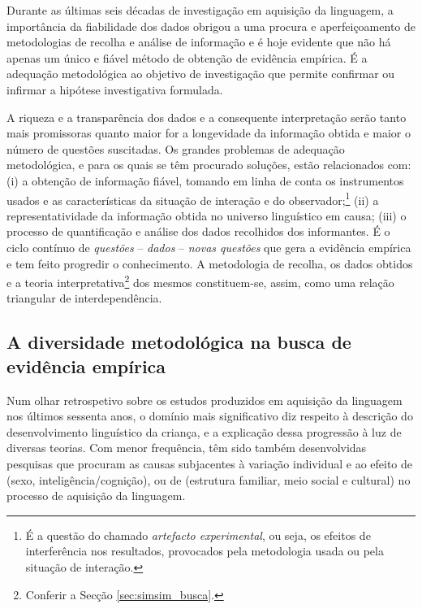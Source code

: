 \documentclass[output=paper]{LSP/langsci}
\begin{document}
Durante as últimas seis décadas de investigação em aquisição da linguagem, a importância da fiabilidade dos dados obrigou a uma procura e aperfeiçoamento de metodologias de recolha e análise de informação e é hoje evidente que não há apenas um único e fiável método de obtenção de evidência empírica. É a adequação metodológica ao objetivo de investigação que permite confirmar ou infirmar a hipótese investigativa formulada.

A riqueza e a transparência dos dados e a consequente interpretação serão tanto mais promissoras quanto maior for a longevidade da informação obtida e maior o número de questões suscitadas. Os grandes problemas de adequação metodológica, e para os quais se têm procurado soluções, estão relacionados com: (i) a obtenção de informação fiável, tomando em linha de conta os instrumentos usados e as características da situação de interação e do observador;\footnote{É a questão do chamado \textit{artefacto experimental}, ou seja, os efeitos de interferência nos resultados, provocados pela metodologia usada ou pela situação de interação.} (ii) a representatividade da informação obtida no universo linguístico em causa;  (iii) o processo de quantificação e análise dos dados recolhidos dos informantes. É o ciclo contínuo de \emph{questões} -- \emph{dados} -- \emph{novas questões} que gera a evidência empírica e tem feito progredir o conhecimento. A metodologia de recolha, os dados obtidos e a teoria interpretativa\footnote{Conferir a Secção \ref{sec:simsim_busca}.} dos mesmos constituem-se, assim, como uma relação triangular de interdependência. 

\subsection{A diversidade metodológica na busca de evidência empírica}
\label{subsec:simsim_diversidade}

Num olhar retrospetivo sobre os estudos produzidos em aquisição da linguagem nos últimos sessenta anos, o domínio mais significativo diz respeito à descrição do desenvolvimento linguístico da criança, e a explicação dessa progressão à luz de diversas teorias. Com menor frequência, têm sido também desenvolvidas pesquisas que procuram as causas subjacentes à variação individual e ao efeito de  (sexo, inteligência/cognição), ou de  (estrutura familiar, meio social e cultural) no processo de aquisição da linguagem. 
\end{document}
